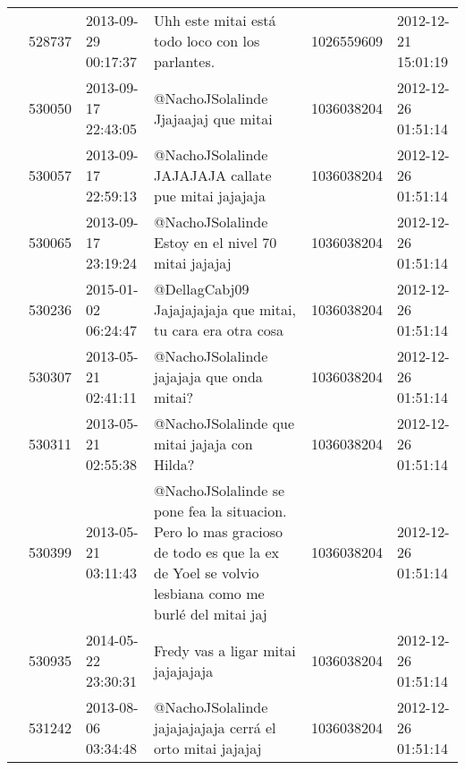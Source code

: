 \begin{tabular}{llllrl}
           & 528737  & 2013-09-29 00:17:37 &                                                                                             Uhh este mitai está todo loco con los parlantes. &  1026559609 & 2012-12-21 15:01:19 \\
           & 530050  & 2013-09-17 22:43:05 &                                                                                                         @NachoJSolalinde Jjajaajaj que mitai &  1036038204 & 2012-12-26 01:51:14 \\
           & 530057  & 2013-09-17 22:59:13 &                                                                                         @NachoJSolalinde JAJAJAJA callate pue mitai jajajaja &  1036038204 & 2012-12-26 01:51:14 \\
           & 530065  & 2013-09-17 23:19:24 &                                                                                          @NachoJSolalinde Estoy en el nivel 70 mitai jajajaj &  1036038204 & 2012-12-26 01:51:14 \\
           & 530236  & 2015-01-02 06:24:47 &                                                                                  @DellagCabj09 Jajajajajaja que mitai, tu cara era otra cosa &  1036038204 & 2012-12-26 01:51:14 \\
           & 530307  & 2013-05-21 02:41:11 &                                                                                                    @NachoJSolalinde jajajaja que onda mitai? &  1036038204 & 2012-12-26 01:51:14 \\
           & 530311  & 2013-05-21 02:55:38 &                                                                                                 @NachoJSolalinde que mitai jajaja con Hilda? &  1036038204 & 2012-12-26 01:51:14 \\
           & 530399  & 2013-05-21 03:11:43 &  @NachoJSolalinde se pone fea la situacion. Pero lo mas gracioso de todo es que la ex de Yoel se volvio lesbiana como me burlé del mitai jaj &  1036038204 & 2012-12-26 01:51:14 \\
           & 530935  & 2014-05-22 23:30:31 &                                                                                                           Fredy vas a ligar mitai jajajajaja &  1036038204 & 2012-12-26 01:51:14 \\
           & 531242  & 2013-08-06 03:34:48 &                                                                                    @NachoJSolalinde jajajajajaja cerrá el orto mitai jajajaj &  1036038204 & 2012-12-26 01:51:14 \\

\end{tabular}
